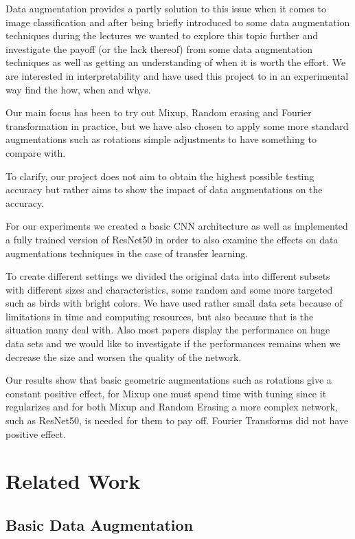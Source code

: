 \documentclass{article}
\begin{document}
Data augmentation provides a partly solution to this issue when it comes to image classification and after being briefly introduced to some data augmentation techniques during the lectures we wanted to explore this topic further and investigate the payoff (or the lack thereof) from some data augmentation techniques as well as getting an understanding of when it is worth the effort. We are interested in interpretability and have used this project to in an experimental way find the how, when and whys. 

Our main focus has been to try out Mixup, Random erasing and Fourier transformation in practice, but we have also chosen to apply some more standard augmentations such as rotations simple adjustments to have something to compare with.

To clarify, our project does not aim to obtain the highest possible testing accuracy but rather aims to show the impact of data augmentations 
on the accuracy. 

For our experiments we created a basic CNN architecture as well as implemented a fully trained version of ResNet50 in order to also examine the effects on data augmentations techniques in the case of transfer learning.

To create different settings we divided the original data into different subsets with different sizes and characteristics, some random and some more targeted such as birds with bright colors. We have used rather small data sets because of limitations in time and computing resources, but also because that is the situation many deal with. Also most papers display the performance on huge data sets and we would like to investigate if the performances remains when we decrease the size and worsen the quality of the network.

Our results show that basic geometric augmentations such as rotations give a constant positive effect, for Mixup one must spend time with tuning since it regularizes and for both Mixup and Random Erasing a more complex network, such as ResNet50, is needed for them to pay off. Fourier Transforms did not have positive effect. 



\section{Related Work}

\subsection{Basic Data Augmentation}
\end{document}
